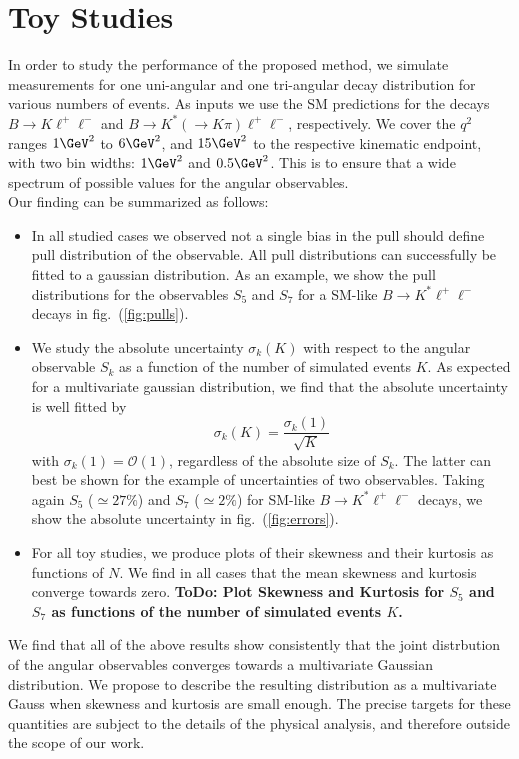 \documentclass[aps,prd,reprint,nofootinbib,preprintnumbers]{revtex4}
\newcommand{\order}[1]{\mathcal{O}\left({#1}\right)}
\newcommand{\reffig}[1]{fig.~(\ref{fig:#1})}
\newcommand{\todo}[1]{{\color{red}\bf ToDo: #1}}
\newcommand{\fred}[1]{{\color{brown!85!black}#1}}
\begin{document}
\section{Toy Studies}
\label{sec:numerics}

In order to study the performance of the proposed method, we simulate
measurements for one uni-angular and one tri-angular decay
distribution for various numbers of events. As inputs we use the SM
predictions for the decays $B\to K\ell^+\ell^-$ and $B\to K^*(\to
K\pi)\ell^+\ell^-$, respectively. We cover the $q^2$ ranges $1 \GeV^2$
to $6 \GeV^2$, and $15 \GeV^2$ to the respective kinematic endpoint,
with two bin widths: $1\GeV^2$ and $0.5\GeV^2$. This is to ensure that
a wide spectrum of possible values for
the angular observables.\\

Our finding can be summarized as follows:
\begin{itemize}
    \item In all studied cases we observed not a single bias in the pull \fred{should define pull} distribution of the observable.
        All pull distributions can successfully be fitted to a gaussian distribution. As an example, we
        show the pull distributions for the observables $S_5$ and $S_7$ for a SM-like $B\to K^*\ell^+\ell^-$
        decays in \reffig{pulls}.
    \item We study the absolute uncertainty $\sigma_k(K)$ with respect to the angular observable $S_k$
        as a function of the number of simulated events $K$. As expected for a multivariate gaussian
        distribution, we find that the absolute uncertainty is well fitted by
        \begin{equation}
            \label{eq:unc-on-mean}
            \sigma_k(K) = \frac{\sigma_k(1)}{\sqrt{K}}
        \end{equation}
        with $\sigma_k(1) = \order{1}$, regardless of the absolute size of $S_k$. The latter can best be shown
        for the example of uncertainties of two observables. Taking again $S_5$ ($\simeq 27\%$) and $S_7$ ($\simeq 2\%$)
        for SM-like $B\to K^*\ell^+\ell^-$ decays, we show the absolute uncertainty in \reffig{errors}.
    \item For all toy studies, we produce plots of their skewness and their kurtosis as functions of
        $N$. We find in all cases that the mean skewness and kurtosis converge towards zero.
        \todo{Plot Skewness and Kurtosis for $S_5$ and $S_7$ as functions of the number of simulated events $K$.}
\end{itemize}
We find that all of the above results show consistently that the joint distrbution of the angular observables
converges towards a multivariate Gaussian distribution. We propose to describe the resulting distribution as
a multivariate Gauss when skewness and kurtosis are small enough. The precise targets for these quantities
are subject to the details of the physical analysis, and therefore outside the scope of our work.
\end{document}
